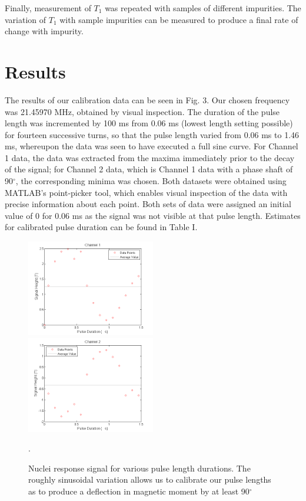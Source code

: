 \documentclass[aps,prl,nofootinbib,twocolumn,superscriptaddress,groupedaddress]{revtex4}  %
\begin{document}
Finally, measurement of $T_{1}$ was repeated with samples of different impurities. The variation of $T_{1}$ with sample impurities can be measured to produce a final rate of change with impurity. 

\section{Results}

The results of our calibration data can be seen in Fig. 3. Our chosen frequency was 21.45970 MHz, obtained by visual inspection. The duration of the pulse length was incremented by 100 ms from 0.06 ms (lowest length setting possible) for fourteen successive turns, so that the pulse length varied from 0.06 ms to 1.46 ms, whereupon the data was seen to have executed a full sine curve. For Channel 1 data, the data was extracted from the maxima immediately prior to the decay of the signal; for Channel 2 data, which is Channel 1 data with a phase shaft of 90$^{\circ}$, the corresponding minima was chosen. Both datasets were obtained using MATLAB's point-picker tool, which enables visual inspection of the data with precise information about each point. Both sets of data were assigned an initial value of 0 for 0.06 ms as the signal was not visible at that pulse length. Estimates for calibrated pulse duration can be found in Table I.

\begin{figure}[t]
\centering
\includegraphics[width=0.5\textwidth]{../Analysis/calibration_channel_1.png} 
\includegraphics[width=0.5\textwidth]{../Analysis/calibration_channel_2.png}
\caption{Nuclei response signal for various pulse length durations. The roughly sinusoidal variation allows us to calibrate our pulse lengths as to produce a deflection in magnetic moment by at least 90$^{\circ}$}.
\end{figure}
\end{document}
